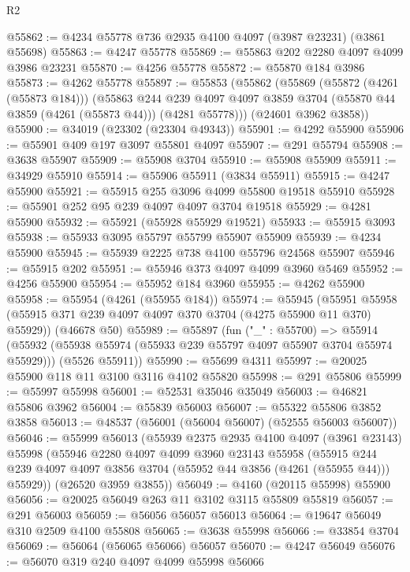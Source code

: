 \begin{lexlean}{R2}
\begin{coremodule}
@55862 := @4234 @55778 @736 @2935 @4100 @4097 (@3987 @23231) (@3861 @55698)
@55863 := @4247 @55778
@55869 := @55863 @202 @2280 @4097 @4099 @3986 @23231
@55870 := @4256 @55778
@55872 := @55870 @184 @3986
@55873 := @4262 @55778
@55897 := @55853
    (@55862
      (@55869
        (@55872 (@4261 (@55873 @184)))
        (@55863
          @244
          @239
          @4097
          @4097
          @3859
          @3704
          (@55870 @44 @3859 (@4261 (@55873 @44)))
          (@4281 @55778)))
      (@24601 @3962 @3858))
@55900 := @34019 (@23302 (@23304 @49343))
@55901 := @4292 @55900
@55906 := @55901 @409 @197 @3097 @55801 @4097
@55907 := @291 @55794
@55908 := @3638 @55907
@55909 := @55908 @3704
@55910 := @55908 @55909
@55911 := @34929 @55910
@55914 := @55906 @55911 (@3834 @55911)
@55915 := @4247 @55900
@55921 := @55915 @255 @3096 @4099 @55800 @19518 @55910
@55928 := @55901 @252 @95 @239 @4097 @4097 @3704 @19518
@55929 := @4281 @55900
@55932 := @55921 (@55928 @55929 @19521)
@55933 := @55915 @3093
@55938 := @55933 @3095 @55797 @55799 @55907 @55909
@55939 := @4234 @55900
@55945 := @55939 @2225 @738 @4100 @55796 @24568 @55907
@55946 := @55915 @202
@55951 := @55946 @373 @4097 @4099 @3960 @5469
@55952 := @4256 @55900
@55954 := @55952 @184 @3960
@55955 := @4262 @55900
@55958 := @55954 (@4261 (@55955 @184))
@55974 := @55945
    (@55951 @55958 (@55915 @371 @239 @4097 @4097 @370 @3704 (@4275 @55900 @11 @370) @55929))
    (@46678 @50)
@55989 := @55897
    (fun ("_" : @55700) =>
    @55914
      (@55932 (@55938 @55974 (@55933 @239 @55797 @4097 @55907 @3704 @55974 @55929)))
      (@5526 @55911))
@55990 := @55699 @4311
@55997 := @20025 @55900 @118 @11 @3100 @3116 @4102 @55820
@55998 := @291 @55806
@55999 := @55997 @55998
@56001 := @52531 @35046 @35049
@56003 := @46821 @55806 @3962
@56004 := @55839 @56003
@56007 := @55322 @55806 @3852 @3858
@56013 := @48537 (@56001 (@56004 @56007) (@52555 @56003 @56007))
@56046 := @55999
    @56013
    (@55939
      @2375
      @2935
      @4100
      @4097
      (@3961 @23143)
      @55998
      (@55946
        @2280
        @4097
        @4099
        @3960
        @23143
        @55958
        (@55915 @244 @239 @4097 @4097 @3856 @3704 (@55952 @44 @3856 (@4261 (@55955 @44))) @55929))
      (@26520 @3959 @3855))
@56049 := @4160 (@20115 @55998) @55900
@56056 := @20025 @56049 @263 @11 @3102 @3115 @55809 @55819
@56057 := @291 @56003
@56059 := @56056 @56057 @56013
@56064 := @19647 @56049 @310 @2509 @4100 @55808
@56065 := @3638 @55998
@56066 := @33854 @3704
@56069 := @56064 (@56065 @56066) @56057
@56070 := @4247 @56049
@56076 := @56070 @319 @240 @4097 @4099 @55998 @56066

\end{coremodule}
\end{lexlean}
